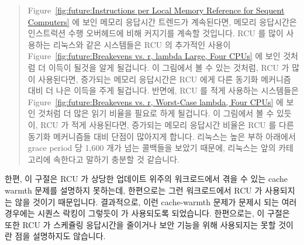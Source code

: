 \begin{quote}
	Figure~\ref{fig:future:Instructions per Local Memory Reference for
	Sequent Computers} 에 보인 메모리 응답시간 트렌드가 계속된다면, 메모리
	응답시간은 인스트럭션 수행 오버헤드에 비해 커지기를 계속할 것입니다.
	RCU 를 많이 사용하는 리눅스와 같은 시스템들은 RCU 의 추가적인 사용이
	Figure~\ref{fig:future:Breakevens vs. r, lambda Large, Four CPUs} 에
	보인 것처럼 더 이득이 될것을 알게 될겁니다.
	이 그림에서 볼 수 있는 것처럼, RCU 가 많이 사용된다면, 증가되는 메모리
	응답시간은 RCU 에게 다른 동기화 메커니즘 대비 더 나은 이득을 주게
	될겁니다.
	반면에, RCU 를 적게 사용하는 시스템들은
	Figure~\ref{fig:future:Breakevens vs. r, Worst-Case lambda, Four CPUs}
	에 보인 것처럼 더 많은 읽기 비율을 필요로 하게 될겁니다.
	이 그림에서 볼 수 있듯이, RCU 가 적게 사용된다면, 증가되는 메모리
	응답시간 비율은 RCU 를 다른 동기화 메커니즘들 대비 단점이 많아지게
	합니다.
	리눅스는 높은 부하 아래에서 grace period 당 1,600 개가 넘는 콜백들을
	보았기 때문에, 리눅스는 앞의 카테고리에 속한다고 말하기 충분할 것
	같습니다.

\end{quote}

한편, 이 구절은 RCU 가 상당한 업데이트 위주의 워크로드에서 겪을 수 있는 cache
warmth 문제를 설명하지 못하는데, 한편으로는 그런 워크로드에서 RCU 가 사용되지는
않을 것이기 때문입니다.
결과적으로, 이런 cache-warmth 문제가 문제시 되는 여러 경우에는 시퀀스 락킹이
그렇듯이  가 사용되도록 되었습니다.
한편으로는, 이 구절은 또한 RCU 가 스케쥴링 응답시간을 줄이거나 보안 기능을 위해
사용되지는 못할 것이란 점을 설명하지도 않습니다.

